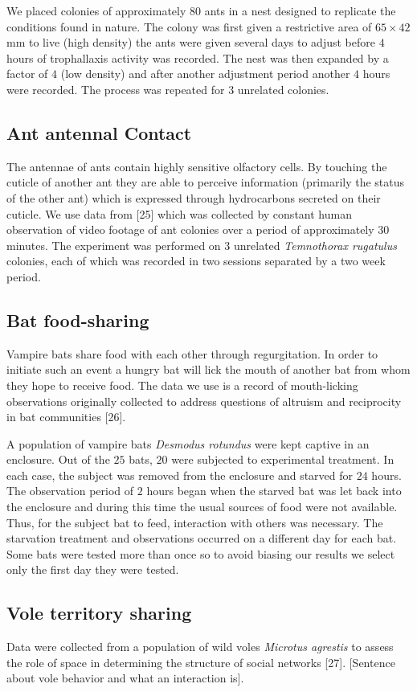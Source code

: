 \documentclass[twocolumn,8pt]{article}
\begin{document}
We placed colonies of approximately $80$ ants in a nest designed to replicate the conditions found in nature. The colony was first given a restrictive area of $65\times 42$mm to live (high density) the ants were given several days to adjust before $4$ hours of trophallaxis activity was recorded. The nest was then expanded by a factor of $4$ (low density) and after another adjustment period another $4$ hours were recorded. The process was repeated for $3$ unrelated colonies.

\subsection{Ant antennal Contact}
The antennae of ants contain highly sensitive olfactory cells. By touching the cuticle of another ant they are able to perceive information (primarily the status of the other ant) which is expressed through hydrocarbons secreted on their cuticle. We use data from [25] which was collected by constant human observation of video footage of ant colonies over a period of approximately 30 minutes. The experiment was performed on $3$ unrelated \emph{Temnothorax rugatulus} colonies, each of which was recorded in two sessions separated by a two week period.

\subsection{Bat food-sharing}
Vampire bats share food with each other through regurgitation. In order to initiate such an event a hungry bat will lick the mouth of another bat from whom they hope to receive food. The data we use is a record of mouth-licking observations originally collected to address questions of altruism and reciprocity in bat communities [26].

A population of vampire bats \emph{Desmodus rotundus} were kept captive in an enclosure. Out of the $25$ bats, $20$ were subjected to experimental treatment. In each case, the subject was removed from the enclosure and starved for $24$ hours. The observation period of $2$ hours began when the starved bat was let back into the enclosure and during this time the usual sources of food were not available. Thus, for the subject bat to feed, interaction with others was necessary. The starvation treatment and observations occurred on a different day for each bat. Some bats were tested more than once so to avoid biasing our results we select only the first day they were tested. 

\subsection{Vole territory sharing} 
Data were collected from a population of wild voles \emph{Microtus agrestis} to assess the role of space in determining the structure of social networks [27]. [Sentence about vole behavior and what an interaction is].
\end{document}

